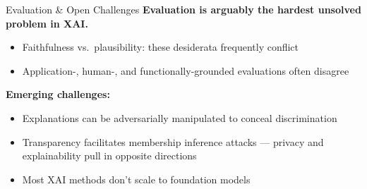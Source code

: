 \documentclass[aspectratio=169]{beamer}
\begin{document}
\begin{frame}{Evaluation \& Open Challenges}
  \textbf{Evaluation is arguably the hardest unsolved problem in XAI.}
  \vspace{0.8em}
  \begin{itemize}
    \item Faithfulness vs.\ plausibility: these desiderata frequently conflict
    \item Application-, human-, and functionally-grounded evaluations often disagree
  \end{itemize}
  \vspace{0.8em}
  \textbf{Emerging challenges:}
  \begin{itemize}
    \item Explanations can be adversarially manipulated to conceal discrimination
    \item Transparency facilitates membership inference attacks --- privacy and explainability pull in opposite directions
    \item Most XAI methods don't scale to foundation models
  \end{itemize}
\end{frame}
\end{document}
